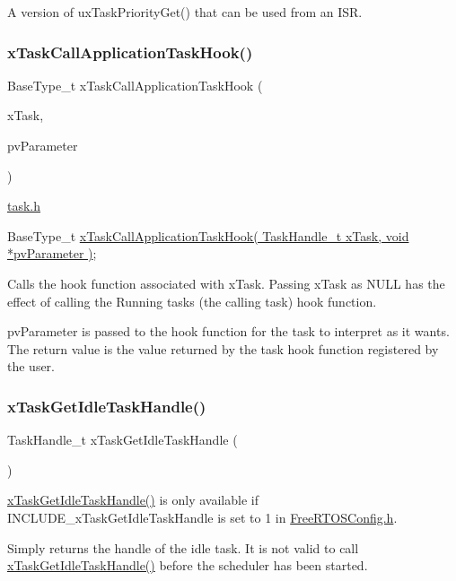 A version of ux\+Task\+Priority\+Get() that can be used from an I\+SR. \mbox{\label{group___tasks_gab6607e5d8a9664e3aa9fe16efa694e83}} 
\subsubsection{\texorpdfstring{x\+Task\+Call\+Application\+Task\+Hook()}{xTaskCallApplicationTaskHook()}}
{\footnotesize\ttfamily Base\+Type\+\_\+t x\+Task\+Call\+Application\+Task\+Hook (\begin{DoxyParamCaption}\item[{Task\+Handle\+\_\+t}]{x\+Task,  }\item[{void $\ast$}]{pv\+Parameter }\end{DoxyParamCaption})}

\hyperlink{task_8h_source}{task.\+h} 
\begin{DoxyPre}BaseType\_t \hyperlink{group___tasks_gab6607e5d8a9664e3aa9fe16efa694e83}{xTaskCallApplicationTaskHook( TaskHandle\_t xTask, void *pvParameter )};\end{DoxyPre}


Calls the hook function associated with x\+Task. Passing x\+Task as N\+U\+LL has the effect of calling the Running tasks (the calling task) hook function.

pv\+Parameter is passed to the hook function for the task to interpret as it wants. The return value is the value returned by the task hook function registered by the user. \mbox{\label{group___tasks_ga3d5446a4403457e855cb84b3bba5570a}} 
\subsubsection{\texorpdfstring{x\+Task\+Get\+Idle\+Task\+Handle()}{xTaskGetIdleTaskHandle()}}
{\footnotesize\ttfamily Task\+Handle\+\_\+t x\+Task\+Get\+Idle\+Task\+Handle (\begin{DoxyParamCaption}\item[{void}]{ }\end{DoxyParamCaption})}

\hyperlink{group___tasks_ga3d5446a4403457e855cb84b3bba5570a}{x\+Task\+Get\+Idle\+Task\+Handle()} is only available if I\+N\+C\+L\+U\+D\+E\+\_\+x\+Task\+Get\+Idle\+Task\+Handle is set to 1 in \hyperlink{_free_r_t_o_s_config_8h_source}{Free\+R\+T\+O\+S\+Config.\+h}.

Simply returns the handle of the idle task. It is not valid to call \hyperlink{group___tasks_ga3d5446a4403457e855cb84b3bba5570a}{x\+Task\+Get\+Idle\+Task\+Handle()} before the scheduler has been started. 